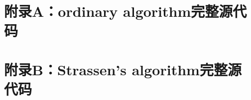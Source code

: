 \documentclass{article}
\begin{document}
\section{附录A：ordinary algorithm完整源代码}
 


\section{附录B：Strassen's algorithm完整源代码}

\end{document}
